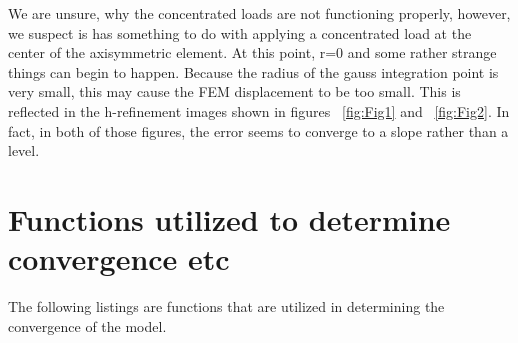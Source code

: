\documentclass[10pt,letterpaper]{report}
\numberwithin{equation}{chapter}
\begin{document}
We are unsure, why the concentrated loads are not functioning properly, however, we suspect is has something to do with applying a concentrated load at the center of the axisymmetric element. At this point, r=0 and some rather strange things can begin to happen. Because the radius of the gauss integration point is very small, this may cause the FEM displacement to be too small. This is reflected in the h-refinement images shown in figures ~\ref{fig:Fig1} and ~\ref{fig:Fig2}. In fact, in both of those figures, the error seems to converge to a slope rather than a level.


\section{Functions utilized to determine convergence etc}
The following listings are functions that are utilized in determining the convergence of the model.
\end{document}

